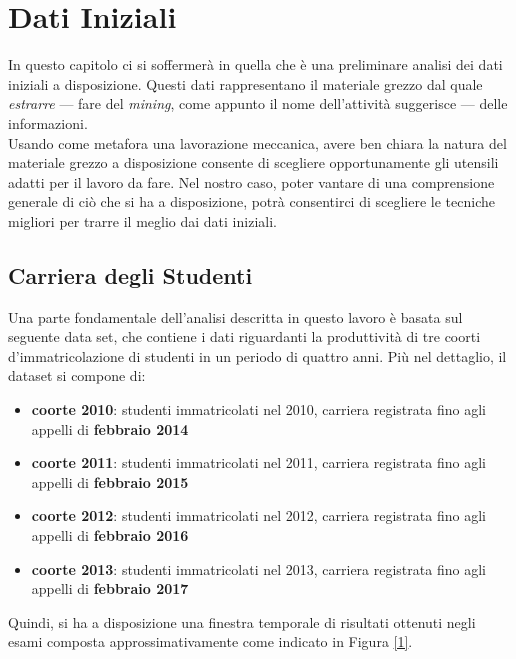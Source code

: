 \chapter{Dati Iniziali}
\label{ch:rawd}

In questo capitolo ci si soffermerà in quella che è una preliminare analisi dei dati iniziali a disposizione. Questi dati rappresentano il materiale grezzo dal quale \textit{estrarre} --- fare del \textit{mining}, come appunto il nome dell'attività suggerisce --- delle informazioni. \\

Usando come metafora una lavorazione meccanica, avere ben chiara la natura del materiale grezzo a disposizione consente di scegliere opportunamente gli utensili adatti per il lavoro da fare. Nel nostro caso, poter vantare di una comprensione generale di ciò che si ha a disposizione, potrà consentirci di scegliere le tecniche migliori per trarre il meglio dai dati iniziali. \\

\section{Carriera degli Studenti}

Una parte fondamentale dell'analisi descritta in questo lavoro è basata sul seguente data set, che contiene i dati riguardanti la produttività di tre coorti d'immatricolazione di studenti in un periodo di quattro anni. Più nel dettaglio, il dataset si compone di:

\begin{itemize}
	\item \textbf{coorte 2010}: studenti immatricolati nel 2010, carriera registrata fino agli appelli di \textbf{febbraio 2014}
	\item \textbf{coorte 2011}: studenti immatricolati nel 2011, carriera registrata fino agli appelli di \textbf{febbraio 2015}
	\item \textbf{coorte 2012}: studenti immatricolati nel 2012, carriera registrata fino agli appelli di \textbf{febbraio 2016}
	\item \textbf{coorte 2013}: studenti immatricolati nel 2013, carriera registrata fino agli appelli di \textbf{febbraio 2017}
\end{itemize}

Quindi, si ha a disposizione una finestra temporale di risultati ottenuti negli esami composta approssimativamente come indicato in Figura \ref{1}. \\

